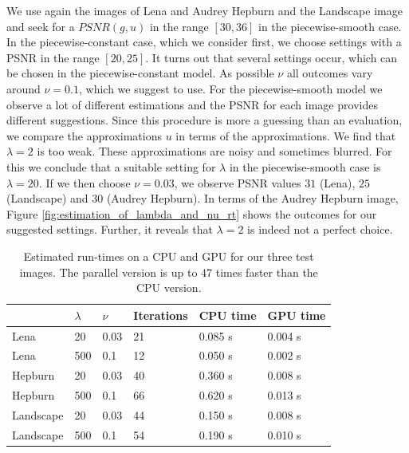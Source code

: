 \documentclass[abstracton]{scrreprt}
\begin{document}
            We use again the images of Lena and Audrey Hepburn and the Landscape image and seek for a $PSNR(g, u)$ in the range $[30, 36]$ in the piecewise-smooth case. In the piecewise-constant case, which we consider first, we choose settings with a PSNR in the range $[20, 25]$. It turns out that several settings occur, which can be chosen in the piecewise-constant model. As possible $\nu$ all outcomes vary around $\nu = 0.1$, which we suggest to use. For the piecewise-smooth model we observe a lot of different estimations and the PSNR for each image provides different suggestions. Since this procedure is more a guessing than an evaluation, we compare the approximations $u$ in terms of the approximations. We find that $\lambda = 2$ is too weak. These approximations are noisy and sometimes blurred. For this we conclude that a suitable setting for $\lambda$ in the piecewise-smooth case is $\lambda = 20$. If we then choose $\nu = 0.03$, we observe PSNR values $31$ (Lena), $25$ (Landscape) and $30$ (Audrey Hepburn). In terms of the Audrey Hepburn image, Figure \ref{fig:estimation_of_lambda_and_nu_rt} shows the outcomes for our suggested settings. Further, it reveals that $\lambda = 2$ is indeed not a perfect choice.\\
            \begin{table}[!ht]
                \parbox{.9\linewidth}{
                \centering
                    \begin{tabular}{| l || l | l | l | l | l |}
                        \hline
                         & $\lambda$ & $\nu$ & Iterations & CPU time & GPU time \\ \hline
                        Lena        & 20  & 0.03 & 21 & 0.085 s & 0.004 s \\ \hline
                        Lena        & 500 & 0.1  & 12 & 0.050 s & 0.002 s \\ \hline
                        Hepburn     & 20  & 0.03 & 40 & 0.360 s & 0.008 s \\ \hline
                        Hepburn     & 500 & 0.1  & 66 & 0.620 s & 0.013 s \\ \hline
                        Landscape   & 20  & 0.03 & 44 & 0.150 s & 0.008 s \\ \hline
                        Landscape   & 500 & 0.1  & 54 & 0.190 s & 0.010 s \\ \hline
                    \end{tabular}
                }
                \caption[Run-Times for best parameters real-time framework.]{Estimated run-times on a CPU and GPU for our three test images. The parallel version is up to $47$ times faster than the CPU version.}
                \label{tab:realtime_cpu_vs_gpu}
            \end{table}
            
\end{document}

